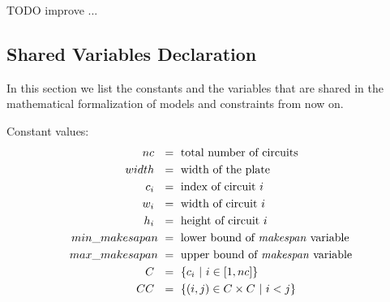     \colorbox{BurntOrange}{TODO improve ...}


\subsection{Shared Variables Declaration}
    In this section we list the constants and the variables that are shared in the mathematical formalization of 
    models and constraints from now on.

    Constant values:
    \begin{align*}
        nc\             &\ =\ \text{total number of circuits}                   \\
        width\          &\ =\ \text{width of the plate}                         \\
        c_i\            &\ =\ \text{index of circuit  } i                       \\
        w_i\            &\ =\ \text{width of circuit  } i                       \\
        h_i\            &\ =\ \text{height of circuit  } i                      \\
        min\_makesapan  &\ =\ \text{lower bound of \textit{makespan} variable}  \\
        max\_makesapan  &\ =\ \text{upper bound of \textit{makespan} variable}  \\
        C\              &\ =\ \{ c_i\ |\ i \in [1, nc]\}                         \\        
        CC\             &\ =\ \{(i, j) \in C \times C\ |\ i<j \}
    \end{align*}

